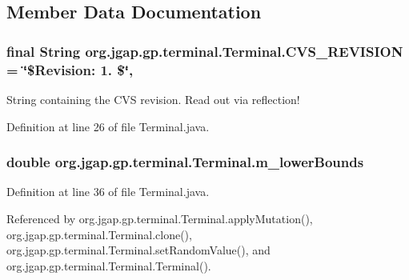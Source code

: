 \subsection{Member Data Documentation}
\hypertarget{classorg_1_1jgap_1_1gp_1_1terminal_1_1_terminal_ad6c80907e530308a3b03cfbad89a31ef}{
\subsubsection[{C\-V\-S\-\_\-\-R\-E\-V\-I\-S\-I\-O\-N}]{\setlength{\rightskip}{0pt plus 5cm}final String org.\-jgap.\-gp.\-terminal.\-Terminal.\-C\-V\-S\-\_\-\-R\-E\-V\-I\-S\-I\-O\-N = \char`\"{}\$Revision\-: 1. \$\char`\"{}\hspace{0.3cm}{\ttfamily [static]}, {\ttfamily [private]}}}\label{classorg_1_1jgap_1_1gp_1_1terminal_1_1_terminal_ad6c80907e530308a3b03cfbad89a31ef}
String containing the C\-V\-S revision. Read out via reflection! 

Definition at line 26 of file Terminal.\-java.

\hypertarget{classorg_1_1jgap_1_1gp_1_1terminal_1_1_terminal_a80247457d366bbbd917324be5fed2a83}{
\subsubsection[{m\-\_\-lower\-Bounds}]{\setlength{\rightskip}{0pt plus 5cm}double org.\-jgap.\-gp.\-terminal.\-Terminal.\-m\-\_\-lower\-Bounds\hspace{0.3cm}{\ttfamily [private]}}}\label{classorg_1_1jgap_1_1gp_1_1terminal_1_1_terminal_a80247457d366bbbd917324be5fed2a83}


Definition at line 36 of file Terminal.\-java.



Referenced by org.\-jgap.\-gp.\-terminal.\-Terminal.\-apply\-Mutation(), org.\-jgap.\-gp.\-terminal.\-Terminal.\-clone(), org.\-jgap.\-gp.\-terminal.\-Terminal.\-set\-Random\-Value(), and org.\-jgap.\-gp.\-terminal.\-Terminal.\-Terminal().

